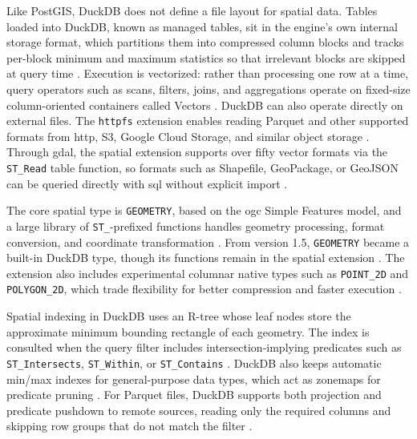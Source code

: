 Like PostGIS, DuckDB does not define a file layout for spatial data. Tables loaded into DuckDB, known as managed tables, sit in the engine's own internal storage format, which partitions them into compressed column blocks and tracks per-block minimum and maximum statistics so that irrelevant blocks are skipped at query time \parencite{raasveldt2019_duckdb_embeddable_analytical_database}. Execution is vectorized: rather than processing one row at a time, query operators such as scans, filters, joins, and aggregations operate on fixed-size column-oriented containers called Vectors \parencite{duckdb2025_vector}. DuckDB can also operate directly on external files. The \texttt{httpfs} extension enables reading Parquet and other supported formats from \acrshort{http}, S3, Google Cloud Storage, and similar object storage \parencite{duckdb2025_documentation_httpfs}. Through \acrshort{gdal}, the spatial extension supports over fifty vector formats via the \texttt{ST\_Read} table function, so formats such as Shapefile, GeoPackage, or GeoJSON can be queried directly with \acrshort{sql} without explicit import \parencite{gabrielsson2023_postgeese_duckdb_spatial_extension}.

The core spatial type is \texttt{GEOMETRY}, based on the \acrshort{ogc} Simple Features model, and a large library of \texttt{ST\_}-prefixed functions handles geometry processing, format conversion, and coordinate transformation \parencite{gabrielsson2023_postgeese_duckdb_spatial_extension, duckdb2025_spatial_extension_overview}. From version 1.5, \texttt{GEOMETRY} became a built-in DuckDB type, though its functions remain in the spatial extension \parencite{duckdb2025_spatial_extension_overview}. The extension also includes experimental columnar native types such as \texttt{POINT\_2D} and \texttt{POLYGON\_2D}, which trade flexibility for better compression and faster execution \parencite{gabrielsson2023_postgeese_duckdb_spatial_extension, duckdb2025_spatial_extension_overview}.

{\sloppy
Spatial indexing in DuckDB uses an R-tree whose leaf nodes store the approximate minimum bounding rectangle of each geometry. The index is consulted when the query filter includes intersection-implying predicates such as \texttt{ST\_Intersects}, \texttt{ST\_Within}, or \texttt{ST\_Contains} \parencite{duckdb2025_spatial_extension_rtree_indexes}. DuckDB also keeps automatic min/max indexes for general-purpose data types, which act as zonemaps for predicate pruning \parencite{duckdb2025_documentation_indexes}. For Parquet files, DuckDB supports both projection and predicate pushdown to remote sources, reading only the required columns and skipping row groups that do not match the filter \parencite{duckdb2025_parquet_overview, duckdb2025_documentation_httpfs}.
\par}

